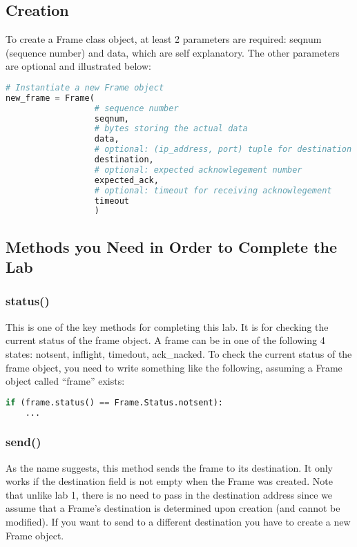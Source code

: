 \documentclass[11pt]{article}
\begin{document}
\subsection{Creation}
To create a Frame class object, at least 2 parameters are required: seqnum (sequence number) and data, which are self explanatory. The other parameters are optional and illustrated below:
\begin{lstlisting}[caption={Frame Object Instantiation}, language=python]
# Instantiate a new Frame object
new_frame = Frame(
                  # sequence number
                  seqnum,
                  # bytes storing the actual data
                  data,
                  # optional: (ip_address, port) tuple for destination
                  destination,
                  # optional: expected acknowlegement number
                  expected_ack,
                  # optional: timeout for receiving acknowlegement
                  timeout
                  )
\end{lstlisting}

\subsection{Methods you Need in Order to Complete the Lab}

\subsubsection{status()}
This is one of the key methods for completing this lab. It is for checking the current status of the frame object. A frame can be in one of the following 4 states: notsent, inflight, timedout, ack\_nacked. To check the current status of the frame object, you need to write something like the following, assuming a Frame object called ``frame'' exists:
\begin{lstlisting}[caption={Frame status}, language=python]
if (frame.status() == Frame.Status.notsent):
    ...
\end{lstlisting}

\subsubsection{send()}
As the name suggests, this method sends the frame to its destination. It only works if the destination field is not empty when the Frame was created. Note that unlike lab 1, there is no need to pass in the destination address since we assume that a Frame's destination is determined upon creation (and cannot be modified). If you want to send to a different destination you have to
create a new Frame object.
\end{document}
